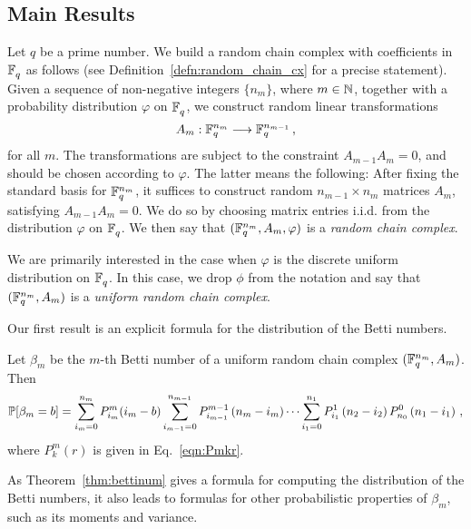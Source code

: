 
\subsection*{Main Results}
Let $q$ be a prime number.  We
build a random chain complex with coefficients in $\mathbb{F}_q^{}$ as follows (see
Definition~\ref{defn:random_chain_cx} for a precise statement). Given a
sequence of non-negative integers $\{n_m\}$, where $m \in \mathbb{N}$, together with a probability
distribution $\varphi$ on $\mathbb{F}_q^{}$, we construct random
linear transformations 
\[
  A_m : \mathbb{F}_q^{n_m} \longrightarrow \mathbb{F}_q^{n_{m-1}} \, ,
\]
for all $m$. The transformations are subject to the constraint $A_{m-1} A_m =
0$, and should be chosen according to $\varphi$. The latter means the
following: After fixing the standard basis for $\mathbb{F}_q^{n_m}$, it suffices to
construct random $n_{m-1} \times n_m$ matrices $A_m$, satisfying $A_{m-1}A_m =
0$. We do so by choosing matrix entries i.i.d. from the distribution $\varphi$
on $\mathbb{F}_q^{}$. We then say that $(\mathbb{F}_q^{n_m}, A_m, \varphi)$ is a {\em random
chain complex}. 

We are primarily interested in the case when $\varphi$ is the discrete uniform distribution on $\mathbb{F}_q^{}$. In this case, we drop $\phi$ from the notation and say that
$(\mathbb{F}_q^{n_m}, A_m)$ is a {\em uniform random chain complex}.


Our first result is an explicit formula for the distribution
of the Betti numbers.
\begin{bigthm} 
  \label{thm:bettinum}
  Let $\beta_m$ be the $m$-th Betti number of a uniform random chain complex
  $(\mathbb{F}_q^{n_m} , A_m)$. Then
  \[    
    \mathbb{P}[\beta_m = b] = \sum_{i_m=0}^{n_{m}} P_{i_m}^{m}(i_m-b)
    \sum_{i_{m-1}=0}^{n_{m-1}} P_{i_{m-1}}^{m-1}\left(n_{m} -i_m\right) \cdots
    \sum_{i_1 = 0}^{n_1} P_{i_1}^1\left(n_2 - i_2\right) P_{n_0}^0 \left(n_1 - i_1\right) \, ,
  \]
  where $P^m_k(r)$ is given in Eq.~\eqref{eqn:Pmkr}.
\end{bigthm}

As Theorem~\ref{thm:bettinum} gives a formula for
computing the distribution of the Betti numbers, it also leads to formulas for
other probabilistic properties of $\beta_m$, such as its moments and variance.

